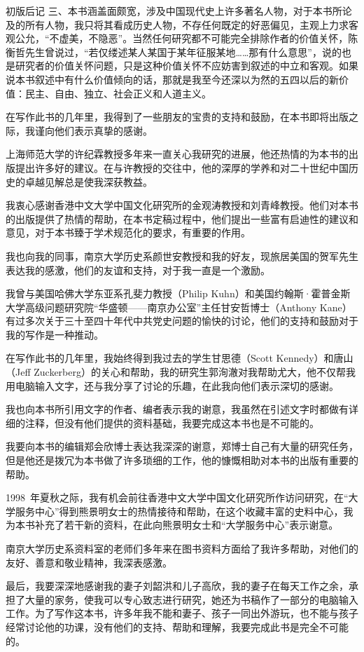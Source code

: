 \begin{pre-post-text}{初版后记}
三、本书涵盖面颇宽，涉及中国现代史上许多著名人物，对于本书所论及的所有人物，我只将其看成历史人物，不存任何既定的好恶偏见，主观上力求客观公允，“不虚美，不隐恶”。当然任何研究都不可能完全排除作者的价值关怀，陈衡哲先生曾说过，“若仅缕述某人某国于某年征服某地……那有什么意思”，说的也是研究者的价值关怀问题，只是这种价值关怀不应妨害到叙述的中立和客观。如果说本书叙述中有什么价值倾向的话，那就是我至今还深以为然的五四以后的新价值：民主、自由、独立、社会正义和人道主义。

在写作此书的几年里，我得到了一些朋友的宝贵的支持和鼓励，在本书即将出版之际，我谨向他们表示真挚的感谢。

上海师范大学的许纪霖教授多年来一直关心我研究的进展，他还热情的为本书的出版提出许多好的建议。在与许教授的交往中，他的深厚的学养和对二十世纪中国历史的卓越见解总是使我深获教益。

我衷心感谢香港中文大学中国文化研究所的金观涛教授和刘青峰教授。他们对本书的出版提供了热情的帮助，在本书定稿过程中，他们提出一些富有启迪性的建议和意见，对于本书臻于学术规范化的要求，有重要的作用。

我也向我的同事，南京大学历史系颜世安教授和我的好友，现旅居美国的贺军先生表达我的感激，他们的友谊和支持，对于我一直是一个激励。

我曾与美国哈佛大学东亚系孔斐力教授（Philip Kuhn）和美国约翰斯·霍普金斯大学高级问题研究院“华盛顿——南京办公室”主任甘安哲博士（Anthony Kane）有过多次关于三十至四十年代中共党史问题的愉快的讨论，他们的支持和鼓励对于我的写作是一种推动。

在写作此书的几年里，我始终得到我过去的学生甘思德（Scott Kennedy）和唐山（Jeff Zuckerberg）的关心和帮助，我的研究生郭洵澈对我帮助尤大，他不仅帮我用电脑输入文字，还与我分享了讨论的乐趣，在此我向他们表示深切的感谢。

我也向本书所引用文字的作者、编者表示我的谢意，我虽然在引述文字时都做有详细的注释，但没有他们提供的资料基础，我要完成这本书也是不可能的。

我要向本书的编辑郑会欣博士表达我深深的谢意，郑博士自己有大量的研究任务，但是他还是拨冗为本书做了许多琐细的工作，他的慷慨相助对本书的出版有重要的帮助。

1998~年夏秋之际，我有机会前往香港中文大学中国文化研究所作访问研究，在“大学服务中心”得到熊景明女士的热情接待和帮助，在这个收藏丰富的史料中心，我为本书补充了若干新的资料，在此向熊景明女士和“大学服务中心”表示谢意。

南京大学历史系资料室的老师们多年来在图书资料方面给了我许多帮助，对他们的友好、善意和敬业精神，我深表感激。

最后，我要深深地感谢我的妻子刘韶洪和儿子高欣，我的妻子在每天工作之余，承担了大量的家务，使我可以专心致志进行研究，她还为书稿作了一部分的电脑输入工作。为了写作这本书，许多年我不能和妻子、孩子一同出外游玩，也不能与孩子经常讨论他的功课，没有他们的支持、帮助和理解，我要完成此书是完全不可能的。

\end{pre-post-text}


